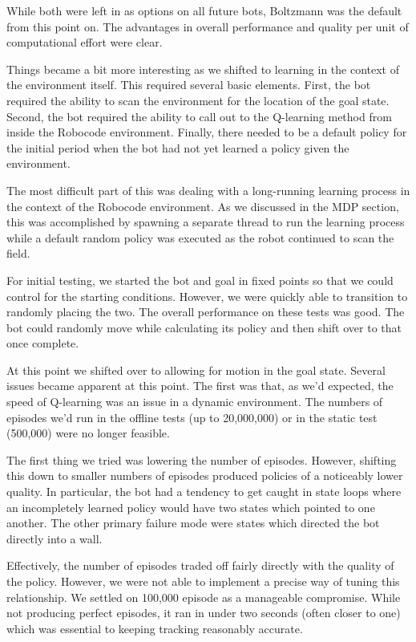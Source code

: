 \documentclass{aiaa-tc}%
\begin{document}
While both were left in as options on all future
bots, Boltzmann was the default from this point on. The advantages in
overall performance and quality per unit of computational effort were clear.

Things became a bit more interesting as we shifted to
learning in the context of the environment itself. This required
several basic elements. First, the bot required the ability to scan
the environment for the location of the goal state. Second, the bot
required the ability to call out to the Q-learning method from inside
the Robocode environment. Finally, there needed to be a default policy
for the initial period when the bot had not yet learned a policy given
the environment. 

The most difficult part of this was dealing with a long-running
learning process in the context of the Robocode environment. As we
discussed in the MDP section, this was accomplished by spawning a
separate thread to run the learning process while a default random
policy was executed as the robot continued to scan the field.

For initial testing, we started the bot and goal in fixed points so
that we could control for the starting conditions. However, we were
quickly able to transition to randomly placing the two. The overall
performance on these tests was good. The bot could randomly move while
calculating its policy and then shift over to that once complete.

At this point we shifted over to allowing for motion in the goal
state. Several issues became apparent at this point. The first was that, as we'd expected, the
speed of Q-learning was an issue in a dynamic environment. The numbers
of episodes we'd run in the offline tests (up to 20,000,000) or in the
static test (500,000) were no
longer feasible. 

The first thing we tried was lowering the number of episodes. However, shifting this down to smaller numbers of episodes produced policies of a noticeably lower quality. In
particular, the bot had a tendency to get caught in state loops where
an incompletely learned policy would have two states which pointed to
one another. The other primary failure mode were states which directed
the bot directly into a wall.

Effectively, the number of episodes traded off fairly directly with
the quality of the policy. However, we were not able to implement a
precise way of tuning this relationship. We settled on 100,000 episode as a manageable
compromise. While not producing perfect episodes, it ran in under two
seconds (often closer to one) which was essential to
keeping tracking reasonably accurate.
\end{document}
